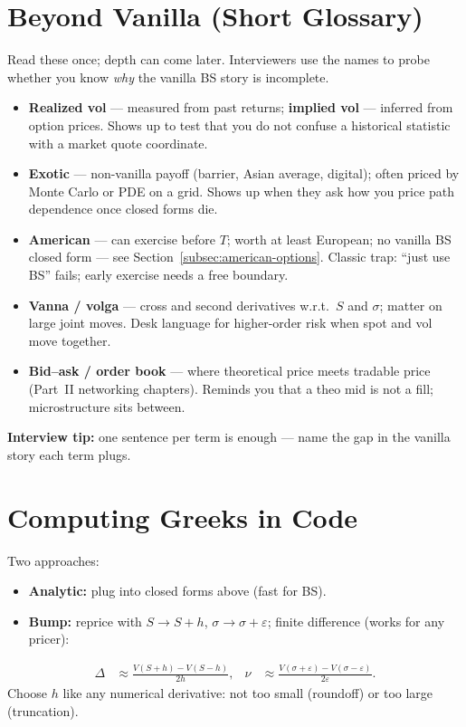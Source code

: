 \section{Beyond Vanilla (Short Glossary)}
\label{sec:beyond-vanilla-glossary}
Read these once; depth can come later. Interviewers use the names to probe whether 
you know \emph{why} the vanilla BS story is incomplete.
\begin{itemize}
    \item \textbf{Realized vol} --- measured from past returns; \textbf{implied vol} --- 
          inferred from option prices.
          Shows up to test that you do not confuse a historical statistic with a 
          market quote coordinate.
    \item \textbf{Exotic} --- non-vanilla payoff (barrier, Asian average, digital); 
          often priced by Monte Carlo or PDE on a grid.
          Shows up when they ask how you price path dependence once closed forms die.
    \item \textbf{American} --- can exercise before $T$; worth at least European; 
          no vanilla BS closed form --- see Section~\ref{subsec:american-options}.
          Classic trap: ``just use BS'' fails; early exercise needs a free boundary.
    \item \textbf{Vanna / volga} --- cross and second derivatives w.r.t.\ $S$ and $\sigma$; 
          matter on large joint moves.
          Desk language for higher-order risk when spot and vol move together.
    \item \textbf{Bid--ask / order book} --- where theoretical price meets tradable price 
          (Part~II networking chapters).
          Reminds you that a theo mid is not a fill; microstructure sits between.
\end{itemize}
\par\noindent\textbf{Interview tip:} one sentence per term is enough --- name the gap in 
the vanilla story each term plugs.

\section{Computing Greeks in Code}
\label{sec:analytic-vs-bump}
Two approaches:
\begin{itemize}
    \item \textbf{Analytic:} plug into closed forms above (fast for BS).
    \item \textbf{Bump:} reprice with $S \to S+h$, $\sigma \to \sigma+\varepsilon$; 
          finite difference (works for any pricer):
\end{itemize}
\begin{align}
  \Delta &\approx \frac{V(S+h) - V(S-h)}{2h} , &
  \nu    &\approx \frac{V(\sigma+\varepsilon) - V(\sigma-\varepsilon)}{2\varepsilon} .
\end{align}
Choose $h$ like any numerical derivative: not too small (roundoff) or too large (truncation).

